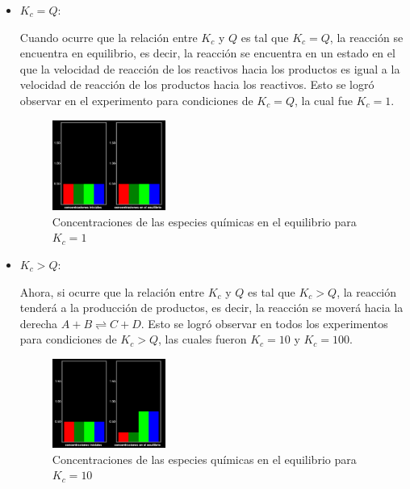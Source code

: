 \documentclass[10pt]{article}
\begin{document}
\begin{multicols*}{2}
\begin{itemize}
            \item $K_c = Q$:

                Cuando ocurre que la relación entre $K_c$ y $Q$ es tal que $K_c = Q$, la reacción se encuentra en equilibrio, es decir, la reacción se encuentra en un estado en el que la velocidad de reacción de los reactivos hacia los productos es igual a la velocidad de reacción de los productos hacia los reactivos. Esto se logró observar en el experimento para condiciones de $K_c = Q$, la cual fue $K_c = 1$.

                \begin{figure}[H]
                    \centering
                    \includegraphics[width=0.35\textwidth]{img/lab1.png}
                    \caption{Concentraciones de las especies químicas en el equilibrio para $K_c = 1$}
                \end{figure}

            \item $K_c > Q$:

                Ahora, si ocurre que la relación entre $K_c$ y $Q$ es tal que $K_c > Q$, la reacción tenderá a la producción de productos, es decir, la reacción se moverá hacia la derecha $A + B \rightleftharpoons C + D$. Esto se logró observar en todos los experimentos para condiciones de $K_c > Q$, las cuales fueron $K_c = 10$ y $K_c = 100$.

                \begin{figure}[H]
                    \centering
                    \includegraphics[width=0.35\textwidth]{img/lab10.png}
                    \caption{Concentraciones de las especies químicas en el equilibrio para $K_c = 10$}
                \end{figure}


\end{itemize}
\end{multicols*}
\end{document}
